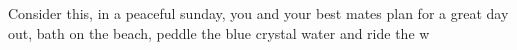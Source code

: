 Consider this, in a peaceful sunday, you and your best mates plan for a great day out, bath on the beach, peddle the blue crystal water and ride the w 